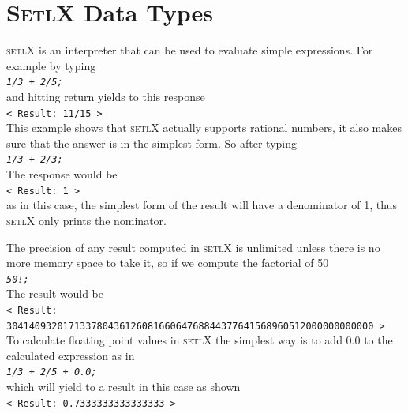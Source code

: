 \documentclass[11pt]{report}
\begin{document}
\section{\textsc{SetlX} Data Types}

\textsc{setlX} is an interpreter that can be used to evaluate simple expressions. For example by typing 
\\[0.2cm]
\hspace*{1.3cm}
\texttt{\textsl{1/3 + 2/5;}}
\\[0.2cm]
and hitting return yields to this response
\\[0.2cm]
\hspace*{1.3cm}
\texttt{< Result: 11/15 >}
\\[0.2cm]
This example shows that \textsc{setlX} actually supports rational numbers, it also makes sure that the answer is in the simplest form. So after typing
\\[0.2cm]
\hspace*{1.3cm}
\texttt{\textsl{1/3 + 2/3;}}
\\[0.2cm]
The response would be
\\[0.2cm]
\hspace*{1.3cm}
\texttt{< Result: 1 >}
\\[0.2cm]
as in this case, the simplest form of the result will have a denominator of 1, thus \textsc{setlX} only prints the nominator.

The precision of any result computed in \textsc{setlX} is unlimited unless there is no more memory space to take it, so if we compute the factorial of 50
\\[0.2cm]
\hspace*{1.3cm}
\texttt{\textsl{50!;}}
\\[0.2cm]
The result would be
\\[0.2cm]
\hspace*{0.6cm}
\texttt{< Result: 30414093201713378043612608166064768844377641568960512000000000000 >}
\\[0.2cm]
To calculate floating point values in \textsc{setlX} the simplest way is to add 0.0 to the calculated expression as in
\\[0.2cm]
\hspace*{1.3cm}
\texttt{\textsl{1/3 + 2/5 + 0.0;}}
\\[0.2cm]
which will yield to a result in this case as shown
\\[0.2cm]
\hspace*{1.3cm}
\texttt{< Result: 0.7333333333333333 >}
\\[0.2cm] 
\end{document}
